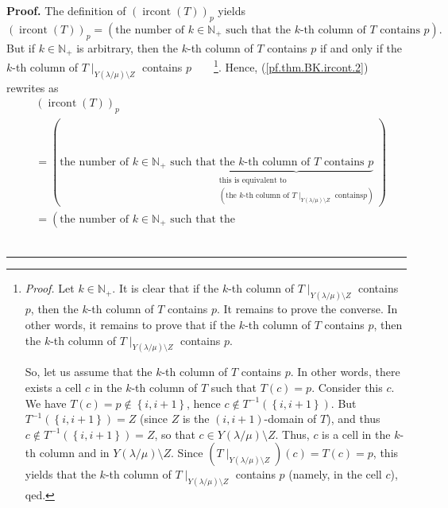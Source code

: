 \documentclass[numbers=enddot,12pt,final,onecolumn,notitlepage]{scrartcl}%
\theoremstyle{definition}
\newenvironment{proof}[1][Proof]{\noindent\textbf{#1.} }{\ \rule{0.5em}{0.5em}}
\newenvironment{verlong}{}{}
\begin{document}
\begin{verlong}
\begin{proof}
The definition of $\left(  \operatorname*{ircont}\left(  T\right)  \right)
_{p}$ yields%
\begin{equation}
\left(  \operatorname*{ircont}\left(  T\right)  \right)  _{p}=\left(
\text{the number of }k\in\mathbb{N}_{+}\text{ such that the }k\text{-th column
of }T\text{ contains }p\right)  . \label{pf.thm.BK.ircont.2}%
\end{equation}
But if $k\in\mathbb{N}_{+}$ is arbitrary, then the $k$-th column of $T$
contains $p$ if and only if the $k$-th column of $T\mid_{Y\left(  \lambda
/\mu\right)  \setminus Z}$ contains $p$\ \ \ \ \footnote{\textit{Proof.} Let
$k\in\mathbb{N}_{+}$. It is clear that if the $k$-th column of $T\mid
_{Y\left(  \lambda/\mu\right)  \setminus Z}$ contains $p$, then the $k$-th
column of $T$ contains $p$. It remains to prove the converse. In other words,
it remains to prove that if the $k$-th column of $T$ contains $p$, then the
$k$-th column of $T\mid_{Y\left(  \lambda/\mu\right)  \setminus Z}$ contains
$p$.
\par
So, let us assume that the $k$-th column of $T$ contains $p$. In other words,
there exists a cell $c$ in the $k$-th column of $T$ such that $T\left(
c\right)  =p$. Consider this $c$. We have $T\left(  c\right)  =p\notin\left\{
i,i+1\right\}  $, hence $c\notin T^{-1}\left(  \left\{  i,i+1\right\}
\right)  $. But $T^{-1}\left(  \left\{  i,i+1\right\}  \right)  =Z$ (since $Z$
is the $\left(  i,i+1\right)  $-domain of $T$), and thus $c\notin
T^{-1}\left(  \left\{  i,i+1\right\}  \right)  =Z$, so that $c\in Y\left(
\lambda/\mu\right)  \setminus Z$. Thus, $c$ is a cell in the $k$-th column and
in $Y\left(  \lambda/\mu\right)  \setminus Z$. Since $\left(  T\mid_{Y\left(
\lambda/\mu\right)  \setminus Z}\right)  \left(  c\right)  =T\left(  c\right)
=p$, this yields that the $k$-th column of $T\mid_{Y\left(  \lambda
/\mu\right)  \setminus Z}$ contains $p$ (namely, in the cell $c$), qed.}.
Hence, (\ref{pf.thm.BK.ircont.2}) rewrites as%
\begin{align}
&  \left(  \operatorname*{ircont}\left(  T\right)  \right)  _{p}\nonumber\\
&  =\left(  \text{the number of }k\in\mathbb{N}_{+}\text{ such that
}\underbrace{\text{the }k\text{-th column of }T\text{ contains }%
p}_{\substack{\text{this is equivalent to}\\\left(  \text{the }k\text{-th
column of }T\mid_{Y\left(  \lambda/\mu\right)  \setminus Z}\text{ contains
}p\right)  }}\right) \nonumber\\
&  =\left(  \text{the number of }k\in\mathbb{N}_{+}\text{ such that the
}
\end{align}
\end{proof}
\end{verlong}
\end{document}
